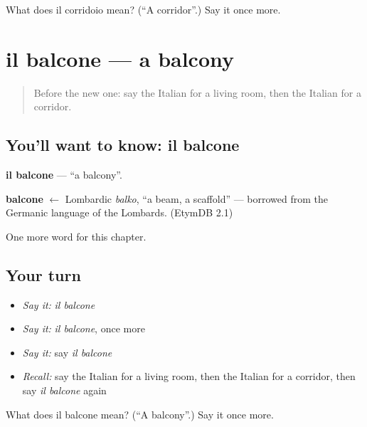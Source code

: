 \begin{tcolorbox}[breakable,colback=teal!4,colframe=teal!35!black,title={Before you move on}]
What does il corridoio mean? (\textquotedblleft{}A corridor\textquotedblright{}.) Say it once more.
\end{tcolorbox}
\section[il balcone]{il balcone — a balcony}

\label{lesson:IT-C159-balcone}



\begin{quote}
Before the new one: say the Italian for a living room, then the Italian for a corridor.
\end{quote}

\subsection*{You'll want to know: il balcone}
\textbf{il balcone} — \textquotedblleft{}a balcony\textquotedblright{}.

\begin{cousinweb}
\textbf{balcone} $\leftarrow$ Lombardic \emph{balko}, \textquotedblleft{}a beam, a scaffold\textquotedblright{} — borrowed from the Germanic language of the Lombards. (EtymDB 2.1)
\end{cousinweb}

\begin{grammarlens}[title={What you've built}]
One more word for this chapter.
\end{grammarlens}

\subsection*{Your turn}
\begin{itemize}
\raggedright
  \item \emph{Say it:} \emph{il balcone}
  \item \emph{Say it:} \emph{il balcone}, once more
  \item \emph{Say it:} say \emph{il balcone}
  \item \emph{Recall:} say the Italian for a living room, then the Italian for a corridor, then say \emph{il balcone} again
\end{itemize}

\begin{tcolorbox}[breakable,colback=teal!4,colframe=teal!35!black,title={Before you move on}]
What does il balcone mean? (\textquotedblleft{}A balcony\textquotedblright{}.) Say it once more.
\end{tcolorbox}
